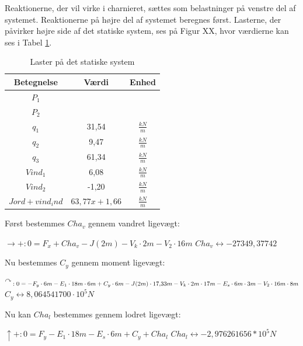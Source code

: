 Reaktionerne, der vil virke i charnieret, sættes som belastninger på venstre del af systemet. 
\newline
\newline
Reaktionerne på højre del af systemet beregnes først.
\newline
\newline
Lasterne, der påvirker højre side af det statiske system, ses på Figur XX, hvor værdierne kan ses i Tabel \ref{tab:laster}.

\begin{table}
	\begin{center}
		\begin{tabular}{|c|c|c|}
			\hline
Betegnelse     & Værdi & Enhed \\ \hline
$P_1$           &       &       \\ \hline
$P_2$           &       &       \\ \hline
$q_1$           & 31,54 & $\frac{kN}{m}$ \\ \hline
$q_2$           & 9,47  & $\frac{kN}{m}$ \\ \hline
$q_3$           & 61,34 & $\frac{kN}{m}$ \\ \hline
$Vind_1$        & 6,08  & $\frac{kN}{m}$ \\ \hline
$Vind_2$       	& -1,20 & $\frac{kN}{m}$ \\ \hline
$Jord+vind_ind$ & $63,\!77x + 1,\!66$ & $\frac{kN}{m}$ \\ \hline
		\end{tabular}
		\caption{Laster på det statiske system}
		\label{tab:laster}
	\end{center}
\end{table}

Først bestemmes $Cha_v$ gennem vandret ligevægt: 
\begin{center}
	$\rightarrow+:0=F_x+Cha_v-J(2m)-V_k\cdot2m-V_2\cdot16m$
	$Cha_v\leftrightarrow -27349,37742$
\end{center}

Nu bestemmes $C_y$ gennem moment ligevægt: 
\begin{center}
	$\AR{}:0=-F_y\cdot6m-E_1\cdot18m\cdot6m+C_y\cdot6m-J(2m)\cdot17,\!33m-V_k\cdot2m\cdot17m-E_s\cdot6m\cdot3m-V_2\cdot16m\cdot8m$
	$C_y\leftrightarrow 8,\!064541700\cdot10^5N$ 
\end{center}

Nu kan $Cha_l$ bestemmes gennem lodret ligevægt: 
\begin{center}
	$\uparrow+:0=F_y-E_1\cdot18m-E_s\cdot6m+C_y+Cha_l$
	$Cha_l \leftrightarrow -2,\!976261656*10^5N$
\end{center}

